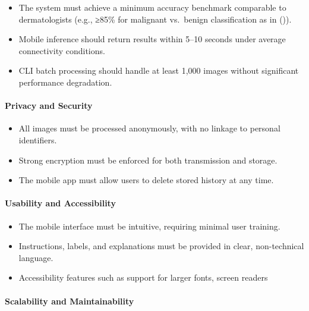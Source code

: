 \documentclass[
  12pt,
  oneside]{article}
\providecommand{\tightlist}{%
  \setlength{\itemsep}{0pt}\setlength{\parskip}{0pt}}
\begin{document}
\begin{itemize}
\tightlist
\item
  The system must achieve a minimum accuracy benchmark comparable to
  dermatologists (e.g., ≥85\% for malignant vs.~benign classification as
  in ()).\\
\item
  Mobile inference should return results within 5--10 seconds under
  average connectivity conditions.\\
\item
  CLI batch processing should handle at least 1,000 images without
  significant performance degradation.
\end{itemize}

\paragraph{Privacy and Security}\label{privacy-and-security}

\begin{itemize}
\tightlist
\item
  All images must be processed anonymously, with no linkage to personal
  identifiers.\\
\item
  Strong encryption must be enforced for both transmission and
  storage.\\
\item
  The mobile app must allow users to delete stored history at any time.
\end{itemize}

\paragraph{Usability and
Accessibility}\label{usability-and-accessibility}

\begin{itemize}
\tightlist
\item
  The mobile interface must be intuitive, requiring minimal user
  training.\\
\item
  Instructions, labels, and explanations must be provided in clear,
  non-technical language.\\
\item
  Accessibility features such as support for larger fonts, screen
  readers
\end{itemize}

\paragraph{Scalability and
Maintainability}\label{scalability-and-maintainability}
\end{document}

